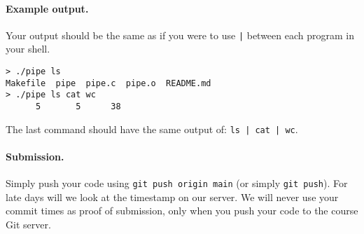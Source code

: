 \paragraph{Example output.}
Your output should be the same as if you were to use \texttt{|} between each
program in your shell.

\begin{lstlisting}
> ./pipe ls
Makefile  pipe	pipe.c	pipe.o	README.md
> ./pipe ls cat wc
      5       5      38
\end{lstlisting}

The last command should have the same output of: \texttt{ls | cat | wc}.

\paragraph{Submission.}

Simply push your code using \lstinline|git push origin main| (or simply
\lstinline|git push|).
For late days will we look at the timestamp on our server.
We will never use your commit times as proof of submission, only when you
push your code to the course Git server.


